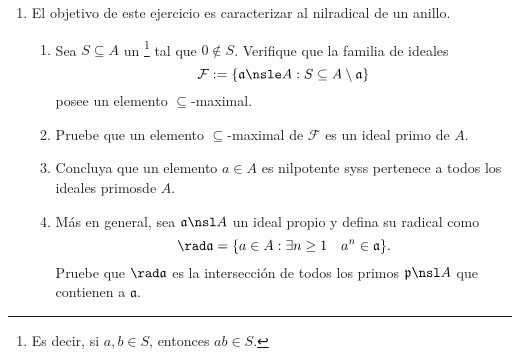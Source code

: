 \documentclass[11pt, reqno]{amsart}
\begin{document}
\begin{enumerate}
	\item El objetivo de este ejercicio es caracterizar al nilradical de un anillo.
		\begin{enumerate}
			\item Sea $S \subseteq A$ un %
				\footnote{Es decir, si $a, b \in S$, entonces $ab \in S$.}
				tal que $0 \notin S$.
				Verifique que la familia de ideales
				\[
					\mathcal{F} := \{ \mathfrak{a} \nsle A : S \subseteq A \setminus \mathfrak{a} \}
				\]
				posee un elemento $\subseteq$-maximal.
			\item Pruebe que un elemento $\subseteq$-maximal de $\mathcal{F}$ es un ideal primo de $A$.
			\item Concluya que un elemento $a \in A$ es nilpotente syss pertenece a todos los ideales
				primos\break de $A$.
			\item Más en general, sea $\mathfrak{a} \nsl A$ un ideal propio y defina su radical como
				\[
					\rad\mathfrak{a} = \{ a \in A : \exists n\ge 1 \quad a^n \in \mathfrak{a} \}.
				\]
				Pruebe que $\rad\mathfrak{a}$ es la intersección de todos los primos $\mathfrak{p} \nsl
				A$ que contienen a $\mathfrak{a}$.
		\end{enumerate}

\end{enumerate}

\appendix
\end{document}
